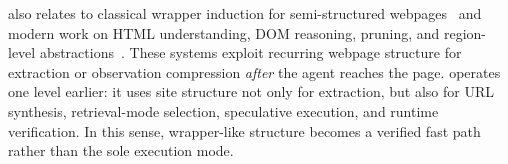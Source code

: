 \sys also relates to classical wrapper induction for
semi-structured webpages~\cite{kushmerick2000wrapper} and modern
work on HTML understanding, DOM reasoning, pruning, and
region-level abstractions~\cite{html_understanding,domqnet,prune4web,region4web,contractskill}.
These systems exploit recurring webpage structure for extraction
or observation compression \emph{after} the agent reaches the page.
\sys operates one level earlier: it uses site structure not only
for extraction, but also for URL synthesis, retrieval-mode
selection, speculative execution, and runtime verification. In
this sense, wrapper-like structure becomes a verified fast path
rather than the sole execution mode.